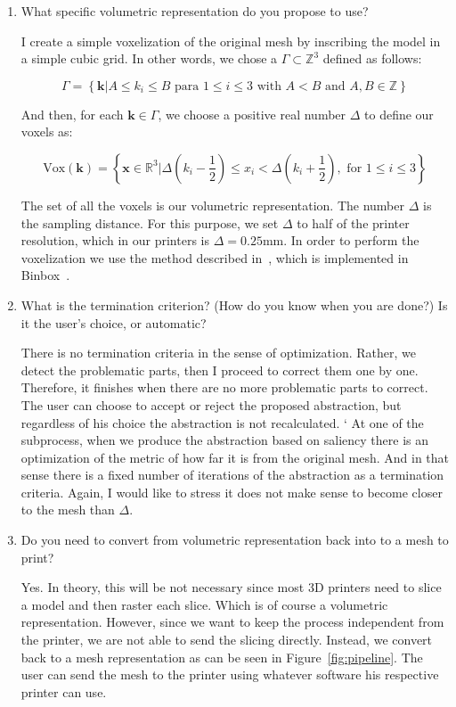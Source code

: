 \begin{enumerate}
	\item What specific volumetric representation do you propose to use?
	
	I create a simple voxelization of the original mesh by inscribing the model in a simple cubic grid. In other words, we chose a $\Gamma \subset \mathbb{Z}^3$ defined as follows: 
	
		$$\Gamma = \left\lbrace \textbf{k} | A \leq k_i \leq B \text{ para } 1 \leq i \leq 3 \text{ with } A < B \text{ and } A, B \in \mathbb{Z} 	\right\rbrace $$
		
	And then, for each $\textbf{k} \in \Gamma$, we choose a positive real number $\Delta$ to define our voxels as:
	
	$$\text{Vox} (\textbf{k}) = \left\lbrace \textbf{x} \in \mathbb{R}^3 | \Delta \left(  k_i - \dfrac{1}{2} \right) \leq x_i < \Delta \left(  k_i + \dfrac{1}{2} \right)  , \text{ for } 1 \leq i \leq 3 \right\rbrace $$
	
	The set of all the voxels is our volumetric representation. The number $\Delta$ is the sampling distance. For this purpose, we set $\Delta$ to half of the printer resolution, which in our printers is $\Delta = 0.25$mm. In order to perform the voxelization we use the method described in~\cite{Nooruddin2003}, which is implemented in Binbox~\cite{Min2016}.
	
	\item What is the termination criterion? (How do you know when you are done?) Is it the user's choice, or automatic?
	
	There is no termination criteria in the sense of optimization. Rather, we detect the problematic parts, then I proceed to correct them one by one. Therefore, it finishes when there are no more problematic parts to correct. The user can choose to accept or reject the proposed abstraction, but regardless of his choice the abstraction is not recalculated.
		`
	At one of the subprocess, when we produce the abstraction based on saliency there is an optimization of the metric of how far it is from the original mesh. And in that sense there is a fixed number of iterations of the abstraction as a termination criteria. Again, I would like to stress it does not make sense to become closer to the mesh than $\Delta$.

  \item Do you need to convert from volumetric representation back into to a mesh to print?
	
	Yes. In theory, this will be not necessary since most 3D printers need to slice a model and then raster each slice. Which is of course a volumetric representation. However, since we want to keep the process independent from the printer, we are not able to send the slicing directly. Instead, we convert back to a mesh representation as can be seen in Figure~\ref{fig:pipeline}. The user can send the mesh to the printer using whatever software his respective printer can use.
	

\end{enumerate}
